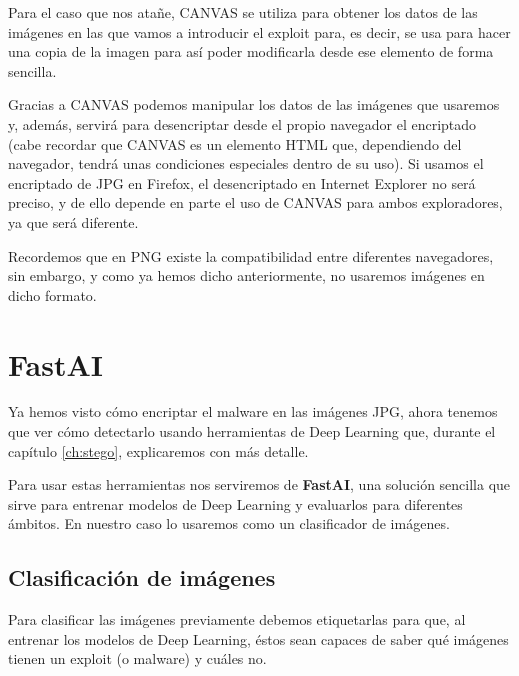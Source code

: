 Para el caso que nos atañe, CANVAS se utiliza para obtener los datos de las imágenes en las que vamos a introducir el exploit para, es decir, se usa para hacer una copia de la imagen para así poder modificarla desde ese elemento de forma sencilla.

Gracias a CANVAS podemos manipular los datos de las imágenes que usaremos y, además, servirá para desencriptar desde el propio navegador el encriptado (cabe recordar que CANVAS es un elemento HTML que, dependiendo del navegador, tendrá unas condiciones especiales dentro de su uso). Si usamos el encriptado de JPG en Firefox, el desencriptado en Internet Explorer no será preciso, y de ello depende en parte el uso de CANVAS para ambos exploradores, ya que será diferente.

Recordemos que en PNG existe la compatibilidad entre diferentes navegadores, sin embargo, y como ya hemos dicho anteriormente, no usaremos imágenes en dicho formato.

\section{FastAI}

Ya hemos visto cómo encriptar el malware en las imágenes JPG, ahora tenemos que ver cómo detectarlo usando herramientas de Deep Learning que, durante el capítulo \ref{ch:stego}, explicaremos con más detalle.

Para usar estas herramientas nos serviremos de \textbf{FastAI}, una solución sencilla que sirve para entrenar modelos de Deep Learning y evaluarlos para diferentes ámbitos. En nuestro caso lo usaremos como un clasificador de imágenes. %

\subsection{Clasificación de imágenes}

Para clasificar las imágenes previamente debemos etiquetarlas para que, al entrenar los modelos de Deep Learning, éstos sean capaces de saber qué imágenes tienen un exploit (o malware) y cuáles no.

